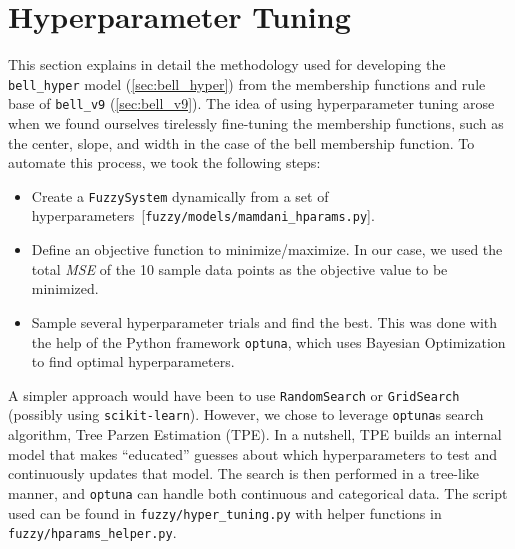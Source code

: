 \documentclass[titlepage]{article}
\newcommand*\apos{\textsc{\char13}}
\begin{document}


\section{Hyperparameter Tuning}
\label{sec:hyper_tuning}

This section explains in detail the methodology used for developing the \texttt{bell\_hyper} model (\cref{sec:bell_hyper}) from the membership functions and rule base of \texttt{bell\_v9} (\cref{sec:bell_v9}).
The idea of using hyperparameter tuning arose when we found ourselves tirelessly fine-tuning the membership functions, such as the center, slope, and width in the case of the bell membership function.
To automate this process, we took the following steps:

\begin{itemize}
    \item Create a \texttt{FuzzySystem} dynamically from a set of hyperparameters~[\texttt{fuzzy/models/mamdani\_hparams.py}].
    \item Define an objective function to minimize/maximize.
          In our case, we used the total \emph{MSE} of the 10 sample data points as the objective value to be minimized.
    \item Sample several hyperparameter trials and find the best.
          This was done with the help of the Python framework \texttt{optuna}, which uses Bayesian Optimization to find optimal hyperparameters.
\end{itemize}

A simpler approach would have been to use \texttt{RandomSearch} or \texttt{GridSearch} (possibly using \texttt{scikit-learn}).
However, we chose to leverage \texttt{optuna}\apos s search algorithm, Tree Parzen Estimation (TPE).
In a nutshell, TPE builds an internal model that makes ``educated'' guesses about which hyperparameters to test and continuously updates that model.
The search is then performed in a tree-like manner, and \texttt{optuna} can handle both continuous and categorical data.
The script used can be found in \texttt{fuzzy/hyper\_tuning.py} with helper functions in \texttt{fuzzy/hparams\_helper.py}.
\end{document}
